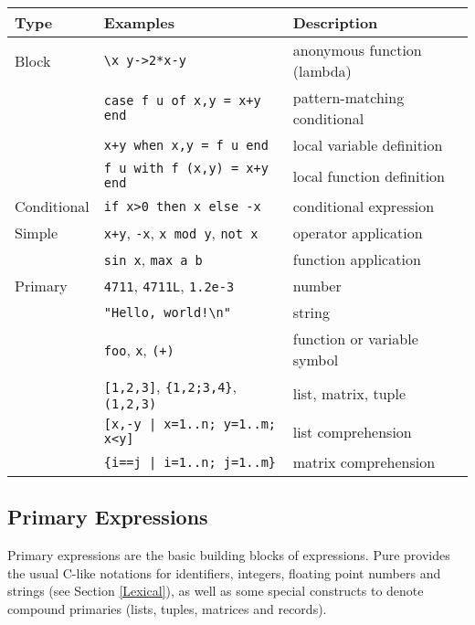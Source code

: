 \documentclass[a4paper,12pt]{article}
\begin{document}
\begin{center}
\begin{tabular}{l|l|l}
Type&Examples&Description\\
\hline\hline
Block&\verb|\x y->2*x-y|&anonymous function (lambda)\\
&\lstinline|case f u of x,y = x+y end|&pattern-matching conditional\\
&\lstinline|x+y when x,y = f u end|&local variable definition\\
&\lstinline|f u with f (x,y) = x+y end|&local function definition\\
\hline
Conditional&\lstinline|if x>0 then x else -x|&conditional expression\\
\hline
Simple&\verb|x+y|, \verb|-x|, \verb|x mod y|, \verb|not x|&operator application\\
&\verb|sin x|, \verb|max a b|&function application\\
\hline
Primary&\verb|4711|, \verb|4711L|, \verb|1.2e-3|&number\\
&\verb|"Hello, world!\n"|&string\\
&\verb|foo|, \verb|x|, \verb|(+)|&function or variable symbol\\
&\verb|[1,2,3]|, \verb|{1,2;3,4}|, \verb|(1,2,3)|&list, matrix, tuple\\
&\verb?[x,-y | x=1..n; y=1..m; x<y]?&list comprehension\\
&\verb?{i==j | i=1..n; j=1..m}?&matrix comprehension\\
\hline
\end{tabular}
\end{center}

\subsection{Primary Expressions}
\label{Primary}

Primary expressions are the basic building blocks of expressions. Pure provides the usual C-like notations for identifiers, integers, floating point numbers and strings (see Section \ref{Lexical}), as well as some special constructs to denote compound primaries (lists, tuples, matrices and records).
\end{document}
